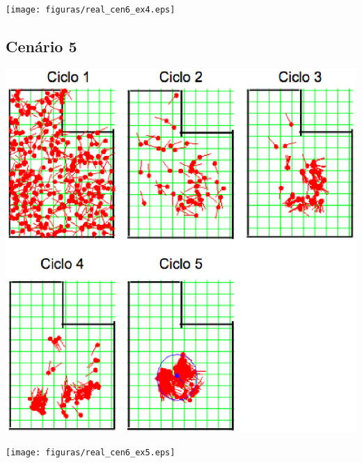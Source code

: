 {\centering
\texttt{[image: figuras/real\_cen6\_ex4.eps]}
\label{img:real_cen6_ex4}
\par}

\subsection{Cenário 5}

{\centering
\includegraphics[scale=0.4]{figuras/cen6_ex5.eps}
\label{img:cen6_ex5}
\par}

{\centering
\texttt{[image: figuras/real\_cen6\_ex5.eps]}
\label{img:real_cen6_ex5}
\par}
